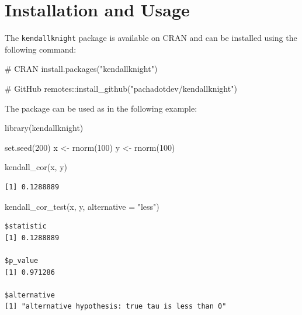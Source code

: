 \documentclass[12pt]{article}
\newenvironment{Shaded}{\begin{snugshade}}{\end{snugshade}}
\newcommand{\AttributeTok}[1]{\textcolor[rgb]{0.40,0.45,0.13}{#1}}
\newcommand{\CommentTok}[1]{\textcolor[rgb]{0.37,0.37,0.37}{#1}}
\newcommand{\DecValTok}[1]{\textcolor[rgb]{0.68,0.00,0.00}{#1}}
\newcommand{\FunctionTok}[1]{\textcolor[rgb]{0.28,0.35,0.67}{#1}}
\newcommand{\NormalTok}[1]{\textcolor[rgb]{0.00,0.23,0.31}{#1}}
\newcommand{\OtherTok}[1]{\textcolor[rgb]{0.00,0.23,0.31}{#1}}
\newcommand{\SpecialCharTok}[1]{\textcolor[rgb]{0.37,0.37,0.37}{#1}}
\newcommand{\StringTok}[1]{\textcolor[rgb]{0.13,0.47,0.30}{#1}}
\begin{document}
\section{Installation and Usage}\label{installation-and-usage}

The \texttt{kendallknight} package is available on CRAN and can be
installed using the following command:

\begin{Shaded}
\begin{Highlighting}[]
\CommentTok{\# CRAN}
\FunctionTok{install.packages}\NormalTok{(}\StringTok{"kendallknight"}\NormalTok{)}

\CommentTok{\# GitHub}
\NormalTok{remotes}\SpecialCharTok{::}\FunctionTok{install\_github}\NormalTok{(}\StringTok{"pachadotdev/kendallknight"}\NormalTok{)}
\end{Highlighting}
\end{Shaded}

The package can be used as in the following example:

\begin{Shaded}
\begin{Highlighting}[]
\FunctionTok{library}\NormalTok{(kendallknight)}

\FunctionTok{set.seed}\NormalTok{(}\DecValTok{200}\NormalTok{)}
\NormalTok{x }\OtherTok{\textless{}{-}} \FunctionTok{rnorm}\NormalTok{(}\DecValTok{100}\NormalTok{)}
\NormalTok{y }\OtherTok{\textless{}{-}} \FunctionTok{rnorm}\NormalTok{(}\DecValTok{100}\NormalTok{)}

\FunctionTok{kendall\_cor}\NormalTok{(x, y)}
\end{Highlighting}
\end{Shaded}

\begin{verbatim}
[1] 0.1288889
\end{verbatim}

\begin{Shaded}
\begin{Highlighting}[]
\FunctionTok{kendall\_cor\_test}\NormalTok{(x, y, }\AttributeTok{alternative =} \StringTok{"less"}\NormalTok{)}
\end{Highlighting}
\end{Shaded}

\begin{verbatim}
$statistic
[1] 0.1288889

$p_value
[1] 0.971286

$alternative
[1] "alternative hypothesis: true tau is less than 0"
\end{verbatim}
\end{document}

